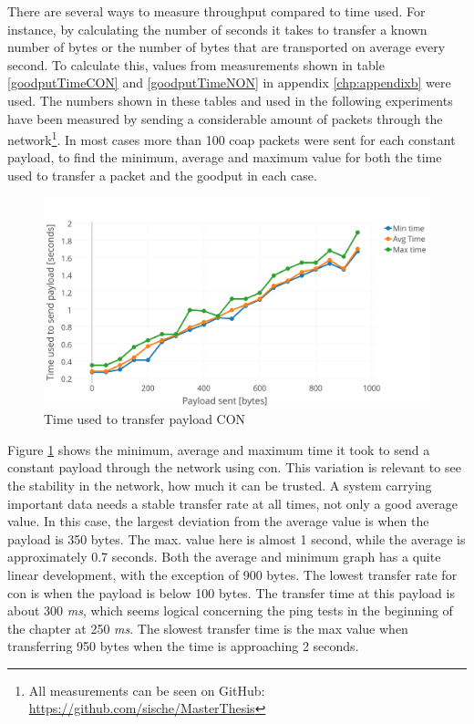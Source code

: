 \noindent There are several ways to measure throughput compared to time used. For instance, by calculating the number of seconds it takes to transfer a known number of bytes or the number of bytes that are transported on average every second. To calculate this, values from measurements shown in table \ref{goodputTimeCON} and \ref{goodputTimeNON} in appendix \ref{chp:appendixb} were used. The numbers shown in these tables and used in the following experiments have been measured by sending a considerable amount of packets through the network\footnote{All measurements can be seen on GitHub: \url{https://github.com/sische/MasterThesis}}. In most cases more than 100 \gls{coap} packets were sent for each constant payload, to find the minimum, average and maximum value for both the time used to transfer a packet and the \gls{goodput} in each case. 

\begin{figure}[h!]
    \centering
    \includegraphics[width=1.0\textwidth]{bytesPrSecondNew3.png}    
    \caption{Time used to transfer payload CON}
    \label{fig:bytesPRSecond3}
\end{figure}


\noindent Figure \ref{fig:bytesPRSecond3} shows the minimum, average and maximum time it took to send a constant payload through the network using \gls{con}. This variation is relevant to see the stability in the network, how much it can be trusted. A system carrying important data needs a stable transfer rate at all times, not only a good average value. In this case, the largest deviation from the average value is when the \gls{payload} is 350 bytes. The max. value here is almost 1 second, while the average is approximately 0.7 seconds. Both the average and minimum graph has a quite linear development, with the exception of 900 bytes. The lowest transfer rate for \gls{con} is when the payload is below 100 bytes. The transfer time at this payload is about 300 \textit{ms}, which seems logical concerning the ping tests in the beginning of the chapter at 250 \textit{ms}. The slowest transfer time is the max value when transferring 950 bytes when the time is approaching 2 seconds.  


